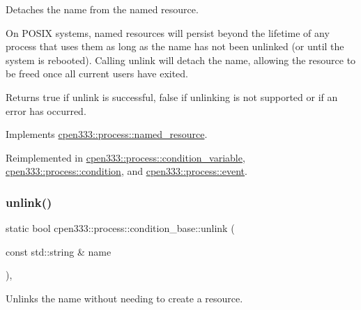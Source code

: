 Detaches the name from the named resource. 

On P\+O\+S\+IX systems, named resources will persist beyond the lifetime of any process that uses them as long as the name has not been unlinked (or until the system is rebooted). Calling {\ttfamily unlink} will detach the name, allowing the resource to be freed once all current users have exited.

\begin{DoxyReturn}{Returns}
{\ttfamily true} if unlink is successful, {\ttfamily false} if unlinking is not supported or if an error has occurred. 
\end{DoxyReturn}


Implements \hyperlink{classcpen333_1_1process_1_1named__resource_a5d33168fee48c9b0c58ab8fd96e230ce}{cpen333\+::process\+::named\+\_\+resource}.



Reimplemented in \hyperlink{classcpen333_1_1process_1_1condition__variable_a2861ec071acc52be7ca5790edd062ee8}{cpen333\+::process\+::condition\+\_\+variable}, \hyperlink{classcpen333_1_1process_1_1condition_a7c646204b2c4912185ba6055c9afa3f6}{cpen333\+::process\+::condition}, and \hyperlink{classcpen333_1_1process_1_1event_a37a2d53cbf4a90da6b4dbd5853f23b32}{cpen333\+::process\+::event}.

\mbox{\label{classcpen333_1_1process_1_1condition__base_a01ed2d247732584166613527ea8e1aff}} 
\subsubsection{\texorpdfstring{unlink()}{unlink()}\hspace{0.1cm}{\footnotesize\ttfamily [2/2]}}
{\footnotesize\ttfamily static bool cpen333\+::process\+::condition\+\_\+base\+::unlink (\begin{DoxyParamCaption}\item[{const std\+::string \&}]{name }\end{DoxyParamCaption})\hspace{0.3cm}{\ttfamily [inline]}, {\ttfamily [static]}}



Unlinks the name without needing to create a resource. 

